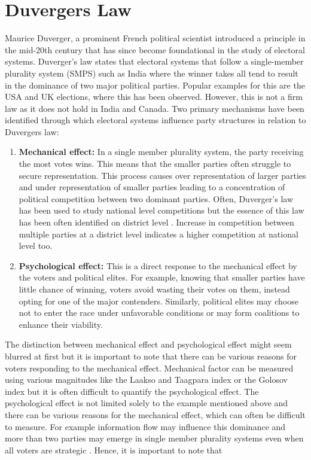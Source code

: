 \section{Duvergers Law}
Maurice Duverger, a prominent French political scientist introduced a principle in the mid-20th century that has since become foundational in the study of electoral systems. Duverger's law states that electoral systems that follow a single-member plurality system (SMPS) such as India where the winner takes all tend to result in the dominance of two major political parties. Popular examples for this are the USA and UK elections, where this has been observed. However, this is not a firm law as it does not hold in India and Canada.
Two primary mechanisms have been identified through which electoral systems influence party structures in relation to Duvergers law:
 \begin{enumerate}
     \item \textbf{Mechanical effect:}  In a single member plurality system, the party receiving the most votes wins. This means that the smaller parties often struggle to secure representation. This process causes over representation of larger parties and under representation of smaller parties leading to a concentration of political competition between two dominant parties. Often, Duverger's law has been used to study national level competitions but the essence of this law has been often identified on district level \citep{cox1997making,GALLAGHER199133,lijphart1994,rae1971political}. Increase in competition between multiple parties at a district level indicates a higher competition at national level too.
     \item \textbf{Psychological effect:} This is a direct response to the mechanical effect by the voters and political elites. For example, knowing that smaller parties have little chance of winning, voters avoid wasting their votes on them, instead opting for one of the major contenders. Similarly, political elites may choose not to enter the race under unfavorable conditions or may form coalitions to enhance their viability.
 \end{enumerate}
 The distinction between mechanical effect and psychological effect might seem blurred at first but it is important to note that there can be various reasons for voters responding to the mechanical effect. Mechanical factor can be measured using various magnitudes like the Laakso and Taagpara index \citep{laakso1979effective} or the Golosov index \citep{golosov2010effective} but it is often difficult to quantify the psychological effect. The psychological effect is not limited solely to the example mentioned above and there can be various reasons for the mechanical effect, which can often be difficult to measure. For example information flow may influence this dominance and more than two parties may emerge in single member plurality systems even when all voters are strategic \citep{clough2007strategic}. Hence, it is important to note that 

